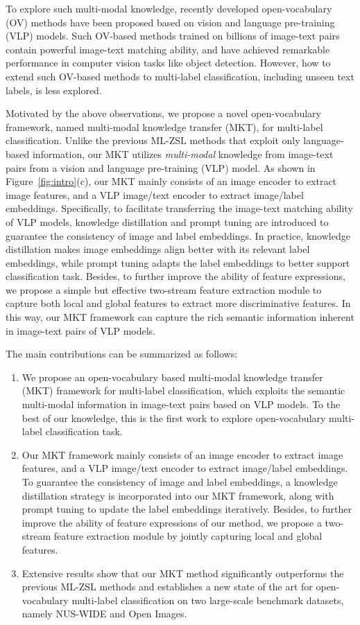 \documentclass[letterpaper]{article} \usepackage{aaai23}  \usepackage{times}  \usepackage{helvet}  \usepackage{courier}  \usepackage[hyphens]{url}  \usepackage{graphicx} \urlstyle{rm} \def\UrlFont{\rm}  \usepackage{natbib}  \usepackage{caption} \frenchspacing  \setlength{\pdfpagewidth}{8.5in}  \setlength{\pdfpageheight}{11in}
\begin{document}
To explore such multi-modal knowledge, recently developed open-vocabulary (OV) methods \cite{openvild, opensedo, openseg, openprompt, liang2022mind} have been proposed  based on vision and language pre-training (VLP) models.
Such OV-based methods trained on billions of image-text pairs contain powerful image-text matching ability, and have achieved remarkable performance in computer vision tasks like object detection.
However,  how to extend such OV-based methods  to multi-label classification, including unseen text labels, is less explored.
\par
Motivated by the above observations, 
we propose a novel open-vocabulary framework, named multi-modal knowledge transfer (MKT), for multi-label classification.
Unlike the previous ML-ZSL methods that exploit only language-based information, our MKT utilizes \textit{multi-modal} knowledge from image-text pairs from a  vision and language pre-training (VLP) model.
As shown in Figure~\ref{fig:intro}(c), our MKT mainly consists of an image encoder to extract image features,  and a VLP image/text encoder
to extract image/label embeddings.
Specifically,  
to facilitate transferring the image-text matching ability of VLP models, 
knowledge distillation and prompt tuning are introduced to guarantee the consistency of image and label embeddings.
In practice, knowledge distillation  makes image embeddings align better with its relevant label embeddings, while prompt tuning adapts the label embeddings to better support classification task.
Besides, to further improve the ability of feature  expressions,
we propose a simple but effective two-stream feature extraction module to capture both local and global features to extract more discriminative features.
In this way, our MKT framework can capture the rich semantic information inherent in image-text pairs of VLP models.
\par
The main contributions can be summarized as follows:
\begin{enumerate}
    \item We propose an open-vocabulary based multi-modal knowledge transfer (MKT) framework for multi-label classification, which exploits the semantic multi-modal information in image-text pairs based on VLP models.
    To the best of our knowledge, this is the first work to explore open-vocabulary multi-label classification task.
    \item Our MKT framework mainly consists of an image encoder to extract image features, and a VLP image/text encoder to extract image/label embeddings.
    To guarantee the consistency of image and label embeddings, a knowledge distillation strategy is incorporated into our MKT framework, along with prompt tuning to update the label embeddings iteratively.   Besides, to further improve the ability of feature expressions of our method, 
    we propose a two-stream feature extraction module by  jointly capturing local and global features. 
    \item Extensive results show that our MKT method significantly outperforms the previous ML-ZSL methods and establishes a new state of the art for open-vocabulary multi-label classification on two large-scale benchmark datasets, namely NUS-WIDE and Open Images.
\end{enumerate}
\end{document}
